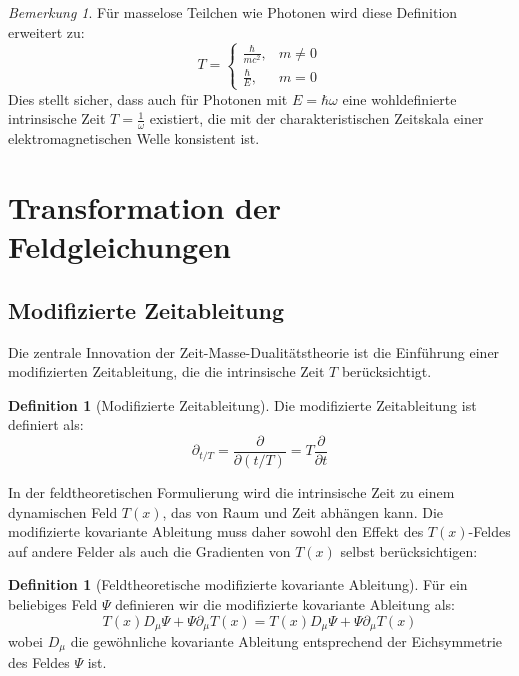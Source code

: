 \documentclass{article}
\theoremstyle{definition}
\newtheorem{definition}[theorem]{Definition}
\theoremstyle{remark}
\newtheorem{remark}[theorem]{Bemerkung}
\newcommand{\Tfield}{T(x)} %
\newcommand{\DcovT}[1]{\Tfield D_\mu #1 + #1 \partial_\mu \Tfield}
\begin{document}
		\begin{remark}
			Für masselose Teilchen wie Photonen wird diese Definition erweitert zu:
			\begin{equation}
				T = 
				\begin{cases}
					\frac{\hbar}{mc^2}, & m \neq 0 \\
					\frac{\hbar}{E}, & m = 0
				\end{cases}
			\end{equation}
			Dies stellt sicher, dass auch für Photonen mit $E = \hbar\omega$ eine wohldefinierte intrinsische Zeit $T = \frac{1}{\omega}$ existiert, die mit der charakteristischen Zeitskala einer elektromagnetischen Welle konsistent ist.
		\end{remark}
		
		\section{Transformation der Feldgleichungen}
		
		\subsection{Modifizierte Zeitableitung}
		
		Die zentrale Innovation der Zeit-Masse-Dualitätstheorie ist die Einführung einer modifizierten Zeitableitung, die die intrinsische Zeit $T$ berücksichtigt.
		
		\begin{definition}[Modifizierte Zeitableitung]
			Die modifizierte Zeitableitung ist definiert als:
			\begin{equation}
				\partial_{t/T} = \frac{\partial}{\partial(t/T)} = T\frac{\partial}{\partial t}
			\end{equation}
		\end{definition}
		
		In der feldtheoretischen Formulierung wird die intrinsische Zeit zu einem dynamischen Feld $\Tfield$, das von Raum und Zeit abhängen kann. Die modifizierte kovariante Ableitung muss daher sowohl den Effekt des $\Tfield$-Feldes auf andere Felder als auch die Gradienten von $\Tfield$ selbst berücksichtigen:
		
		\begin{definition}[Feldtheoretische modifizierte kovariante Ableitung]
			Für ein beliebiges Feld $\Psi$ definieren wir die modifizierte kovariante Ableitung als:
			\begin{equation}
				\DcovT{\Psi} = \Tfield D_\mu \Psi + \Psi \partial_\mu \Tfield
			\end{equation}
			wobei $D_\mu$ die gewöhnliche kovariante Ableitung entsprechend der Eichsymmetrie des Feldes $\Psi$ ist.
		\end{definition}
		
\end{document}
